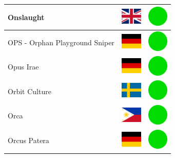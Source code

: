 \documentclass[12pt, a4paper, twoside]{report}
\begin{document}
\begin{center}
\begin{longtable}{|p{5cm}|p{2cm}|p{2cm}|}
 Onslaught                                                  & \includegraphics[width=1cm]{../img/flags/gb} &   \includegraphics[width=1cm]{../likes/y} \\ \hline
 OPS - Orphan Playground Sniper                             & \includegraphics[width=1cm]{../img/flags/de} &   \includegraphics[width=1cm]{../likes/y} \\ \hline
 Opus Irae                                                  & \includegraphics[width=1cm]{../img/flags/de} &   \includegraphics[width=1cm]{../likes/y} \\ \hline
 Orbit Culture                                              & \includegraphics[width=1cm]{../img/flags/se} &   \includegraphics[width=1cm]{../likes/y} \\ \hline
 Orca                                                       & \includegraphics[width=1cm]{../img/flags/ph} &   \includegraphics[width=1cm]{../likes/y} \\ \hline
 Orcus Patera                                               & \includegraphics[width=1cm]{../img/flags/de} &   \includegraphics[width=1cm]{../likes/y} \\ \hline

\end{longtable}
\end{center}
\end{document}
